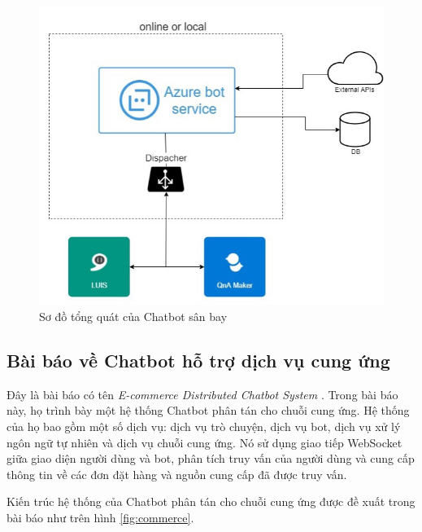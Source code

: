 \begin{center}
    \begin{figure}[ht!]
        \begin{center}
         \includegraphics[scale=1]{chapter2/img/airportarch.png}
        \end{center}
        \caption{Sơ đồ tổng quát của Chatbot sân bay}
        \label{fig:airportarch}
    \end{figure}
\end{center}

\subsection{Bài báo về Chatbot hỗ trợ dịch vụ cung ứng}
Đây là bài báo có tên \textit{E-commerce Distributed Chatbot System} \cite{commerce}. Trong bài báo này, họ trình bày một hệ thống Chatbot phân tán cho chuỗi cung ứng. Hệ thống của họ bao gồm một số dịch vụ: dịch vụ trò chuyện, dịch vụ bot, dịch vụ xử lý ngôn ngữ tự nhiên và dịch vụ chuỗi cung ứng. Nó sử dụng giao tiếp WebSocket giữa giao diện người dùng và bot, phân tích truy vấn của người dùng và cung cấp thông tin về các đơn đặt hàng và nguồn cung cấp đã được truy vấn.

Kiến trúc hệ thống của Chatbot phân tán cho chuỗi cung ứng được đề xuất trong bài báo như trên hình \ref{fig:commerce}.

